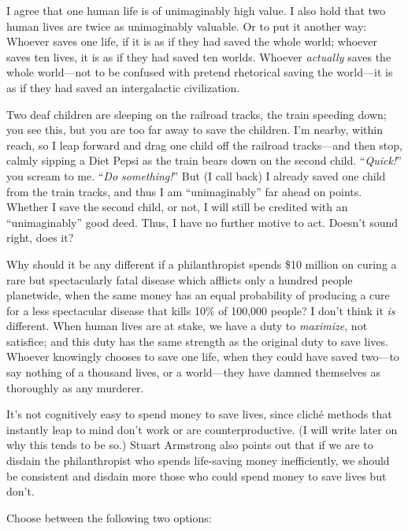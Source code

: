  I agree that one human life is of unimaginably high value. I also
hold that two human lives are twice as unimaginably valuable. Or to put
it another way: Whoever saves one life, if it is as if they had saved
the whole world; whoever saves ten lives, it is as if they had saved
ten worlds. Whoever \textit{actually} saves the whole world---not to be
confused with pretend rhetorical saving the world---it is as if they
had saved an intergalactic civilization.


 Two deaf children are sleeping on the railroad tracks, the train
speeding down; you see this, but you are too far away to save the
children. I'm nearby, within reach, so I leap forward
and drag one child off the railroad tracks---and then stop, calmly
sipping a Diet Pepsi as the train bears down on the second child.
``\textit{Quick!}'' you scream to
me. ``\textit{Do something!}'' But
(I call back) I already saved one child from the train tracks, and thus
I am ``unimaginably'' far ahead on
points. Whether I save the second child, or not, I will still be
credited with an ``unimaginably''
good deed. Thus, I have no further motive to act.
Doesn't sound right, does it?


 Why should it be any different if a philanthropist spends \$10
million on curing a rare but spectacularly fatal disease which afflicts
only a hundred people planetwide, when the same money has an equal
probability of producing a cure for a less spectacular disease that
kills 10\% of 100,000 people? I don't think it
\textit{is} different. When human lives are at stake, we have a duty to
\textit{maximize}, not satisfice; and this duty has the same strength
as the original duty to save lives. Whoever knowingly chooses to save
one life, when they could have saved two---to say nothing of a thousand
lives, or a world---they have damned themselves as thoroughly as any
murderer.


 It's not cognitively easy to spend money to save
lives, since cliché methods that instantly leap to mind
don't work or are counterproductive. (I will write
later on why this tends to be so.) Stuart Armstrong also points out
that if we are to disdain the philanthropist who spends life-saving
money inefficiently, we should be consistent and disdain more those who
could spend money to save lives but don't.

\myendsectiontext



 Choose between the following two options:

